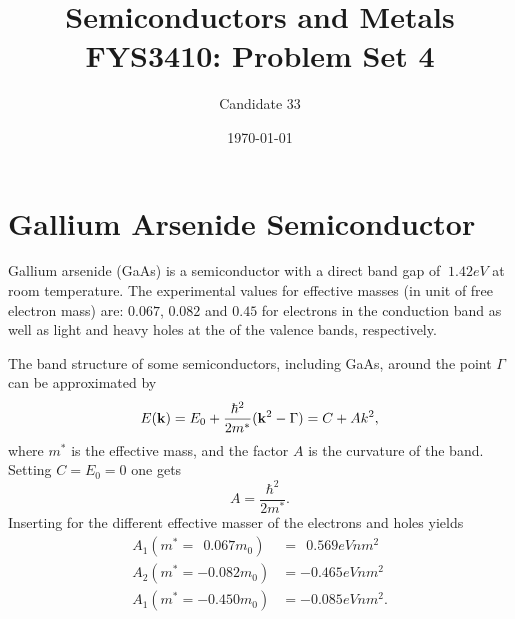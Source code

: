 \documentclass[11pt]{amsart}
\title[Problem Set 4]{Semiconductors and Metals\\
			\hrulefill \small{ FYS3410: Problem Set 4 } \hrulefill}
\author{Candidate 33}
\date{\today}
\begin{document}
\maketitle

\setcounter{section}{2}

\section{Gallium Arsenide Semiconductor}
Gallium arsenide (GaAs) is a semiconductor with a direct band gap of $~1.42eV$ at room temperature. The experimental values for effective masses (in unit of free electron mass) are: $0.067$, $0.082$ and $0.45$ for electrons in the conduction band as well as light and heavy holes at the of the valence bands, respectively. 

The band structure of some semiconductors, including GaAs, around the point $\Gamma$ can be approximated by
\begin{equation}
E(\vb{k}) = E_0 + \frac{\hbar^2}{2m^*}(\vb{k}^2 - \Gamma) = C + Ak^2,
\end{equation}
where $m^*$ is the effective mass, and the factor $A$ is the curvature of the band. Setting $C=E_0=0$ one gets
\begin{equation}
A = \frac{\hbar^2}{2m^*}.
\end{equation}
Inserting for the different effective masser of the electrons and holes yields
\begin{align*}
A_1(m^* = \ \  0.067m_0) &= \ \ 0.569eVnm^2 \\ 
A_2(m^* = -0.082m_0) &= -0.465eVnm^2 \\
A_1(m^* = -0.450m_0) &= -0.085eVnm^2.
\end{align*}
\end{document}
